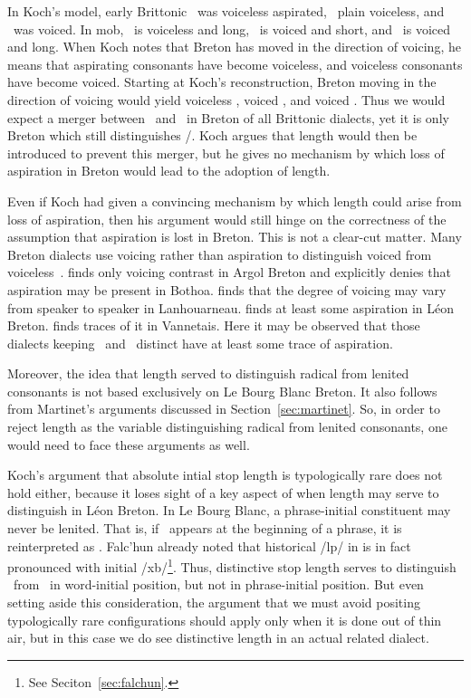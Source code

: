 In Koch's model, early Brittonic \xT\ was voiceless aspirated, \lT\ plain voiceless, and \xD\ was voiced. In \gls{mob}, \xT\ is voiceless and long, \lT\ is voiced and short, and \xD\ is voiced and long. When Koch notes that Breton has moved in the direction of voicing, he means that aspirating consonants have become voiceless, and voiceless consonants have become voiced. Starting at Koch's reconstruction, Breton moving in the direction of voicing would yield voiceless \xT, voiced \lT, and voiced \xD{}. Thus we would expect a merger between \lT\ and \xD\ in Breton of all Brittonic dialects, yet it is only Breton which still distinguishes \lT/\xD. Koch argues that length would then be introduced to prevent this merger, but he gives no mechanism by which loss of aspiration in Breton would lead to the adoption of length. 

Even if Koch had given a convincing mechanism by which length could arise from loss of aspiration, then his argument would still hinge on the correctness of the assumption that aspiration is lost in Breton. This is not a clear-cut matter. Many Breton dialects use voicing rather than aspiration to distinguish voiced from voiceless~\autocite[221]{Ios_Representation13}. \Textcite[114]{Bot_Etude82} finds only voicing contrast in Argol Breton and \textcite[177--178]{Hum_Phonologie95a} explicitly denies that aspiration may be present in Bothoa.  \Textcite[9]{carlyle_syllabic_1988} finds that the degree of voicing may vary from speaker to speaker in Lanhouarneau. \Textcite[157--167]{falchun_systeme_1951} finds at least some aspiration in  Léon Breton. \Textcite{Ter_Grammaire70} finds traces of it in Vannetais. Here it may be observed that those dialects keeping \lT\ and \xD\ distinct have at least some trace of aspiration.

Moreover, the idea that length served to distinguish radical from lenited consonants is not based exclusively on Le Bourg Blanc Breton. It also follows from Martinet's arguments discussed in Section~\ref{sec:martinet}. So, in order to reject length as the variable distinguishing radical from lenited consonants, one would need to face these arguments as well. 

Koch's argument that absolute intial stop length is typologically rare does not hold either, because it loses sight of a key aspect of when length may serve to distinguish in Léon Breton. In Le Bourg Blanc, a phrase-initial constituent may never be lenited. That is, if \lT\ appears at the beginning of a phrase, it is reinterpreted as \xD. Falc'hun already noted that historical /\gls{l}p/ in  is in fact pronounced with initial /\gls{x}b/\footnote{See Seciton~\ref{sec:falchun}.}. Thus, distinctive stop length serves to distinguish \lT\ from \xD\ in word-initial position, but not in phrase-initial position. But even setting aside this consideration, the argument that we must avoid positing typologically rare configurations should apply only when it is done out of thin air, but in this case we do see distinctive length in an actual related dialect. 

